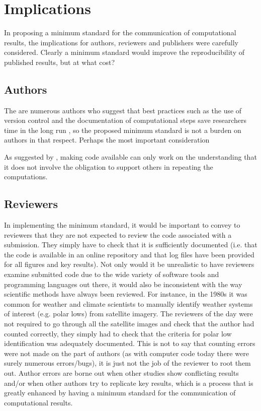 \section{Implications}

In proposing a minimum standard for the communication of computational results, the implications for authors, reviewers and publishers were carefully considered. Clearly a minimum standard would improve the reproducibility of published results, but at what cost?

\subsection{Authors}

The are numerous authors who suggest that best practices such as the use of version control and the documentation of computational steps save researchers time in the long run \citep[e.g.][]{Sandve2014,Wilson2014a}, so the proposed minimum standard is not a burden on authors in that respect. Perhaps the most important consideration 

As suggested by \citet{Easterbrook2014}, making code available can only work on the understanding that it does not involve the obligation to support others in repeating the computations.

\subsection{Reviewers}

In implementing the minimum standard, it would be important to convey to reviewers that they are not expected to review the code associated with a submission. They simply have to check that it is sufficiently documented (i.e. that the code is available in an online repository and that log files have been provided for all figures and key results). Not only would it be unrealistic to have reviewers examine submitted code due to the wide variety of software tools and programming languages out there, it would also be inconsistent with the way scientific methods have always been reviewed. For instance, in the 1980s it was common for weather and climate scientists to manually identify weather systems of interest (e.g. polar lows) from satellite imagery. The reviewers of the day were not required to go through all the satellite images and check that the author had counted correctly, they simply had to check that the criteria for polar low identification was adequately documented. This is not to say that counting errors were not made on the part of authors (as with computer code today there were surely numerous errors/bugs), it is just not the job of the reviewer to root them out. Author errors are borne out when other studies show conflicting results and/or when other authors try to replicate key results, which is a process that is greatly enhanced by having a minimum standard for the communication of computational results.
